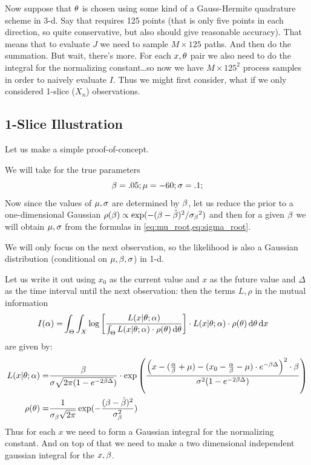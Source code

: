 \documentclass{article}
\begin{document}
Now suppose that ${\theta}$ is chosen using some kind of a Gauss-Hermite quadrature
scheme in 3-d. Say that requires 125 points (that is only five points in each
direction, so quite conservative, but also should give reasonable accuracy).
That means that to evaluate $J$ we need to sample $M \times 125$ paths. And then do
the summation. But wait, there's more. For each $x,{\theta}$ pair we also need to do
the integral for the normalizing constant\ldots so now we have $M \times 125^2$
process samples in order to naively evaluate $I$. 
Thus we might first consider, what if we only considered 1-slice ($X_n$)
observations.

\subsection{1-Slice Illustration}
Let us make a simple proof-of-concept.

We will take for the true parameters
$$
{\beta} = .05; {\mu } = -60; {\sigma } = .1;
$$
Now since the values of ${\mu }, {\sigma }$ are determined by ${\beta}$, let us reduce the prior
to a one-dimensional Gaussian
$\rho({\beta}) \propto \exp( -({\beta} -\hat {{\beta}})^2 / {{\sigma }_{\beta}}^2) $
and then for a given ${\beta}$ we will obtain ${\mu }, {\sigma }$ from
the formulas in \cref{eq:mu_root,eq:sigma_root}.

We will only focus on the next observation, so the likelihood is also a Gaussian
distribution (conditional on ${\mu },{\beta},{\sigma }$) in 1-d. 

Let us write it out using $x_0$ as the current value and $x$ as the future
value and $\Delta$ as the time interval until the next observation:
then the terms $L,\rho$ in the mutual information
\begin{align*}
I({\alpha}) =& \int_\Theta \int_X  \log\left[\frac{L(x|{\theta}; {\alpha})}
										{\int_\Theta L(x|{\theta};{\alpha})\cdot \rho({\theta}) \, \mathrm{d} {\theta}} \right] \cdot L(x|
										{\theta};{\alpha}) \cdot \rho({\theta}) \, \mathrm{d} {\theta} \, \mathrm{d} x
										\end{align*}
										are given by:
\begin{align*}
L(x|{\theta}; {\alpha}) =& \frac{{\beta}}{{\sigma } \sqrt{2\pi(1 -  e^{-2{\beta} \Delta}})}
 	\cdot \exp\left(\frac{\left( x - (\frac {{\alpha}}{{\beta}} + \mu)  - (x_{0} - \frac {{\alpha}}{{\beta}}
 	- \mu) \cdot e^{-{\beta} \Delta} \right)^2 \cdot {\beta}} { {\sigma }^2  (1-e^{-2{\beta}\Delta})}
 	\right) 
 	\\
 	\rho({\theta}) =&  
 	\frac{1}{{\sigma }_{\beta} \sqrt{2\pi} } \exp(-\frac{({\beta}-\hat{{\beta}})^2}{{\sigma }_{\beta}^2}) 
		\end{align*}
Thus for each $x$ we need to form a Gaussian integral for the normalizing
constant. And on top of that we need to make a two dimensional independent
gaussian integral for the $x,{\beta}$.
\end{document}
